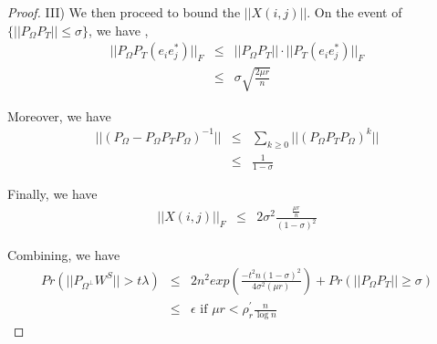 \begin{proof}
III) We then proceed to bound the $||X(i,j)||$. On the event of $\{||P_{\Omega}P_{T}||\le\sigma\}$,
we have , 
\begin{eqnarray*}
||P_{\Omega}P_{T}(e_{i}e_{j}^{*})||_{F} & \le & ||P_{\Omega}P_{T}||\cdot||P_{T}(e_{i}e_{j}^{*})||_{F}\\
 & \le & \sigma\sqrt{\frac{2\mu r}{n}}
\end{eqnarray*}


Moreover, we have 
\begin{eqnarray*}
||(P_{\Omega}-P_{\Omega}P_{T}P_{\Omega})^{-1}|| & \le & \sum_{k\ge0}||(P_{\Omega}P_{T}P_{\Omega})^{k}||\\
 & \le & \frac{1}{1-\sigma}
\end{eqnarray*}


Finally, we have 
\begin{eqnarray*}
||X(i,j)||_{F} & \le & 2\sigma^{2}\frac{\frac{\mu r}{n}}{(1-\sigma)^{2}}
\end{eqnarray*}


Combining, we have 
\begin{eqnarray*}
Pr(||P_{\Omega^{\bot}}W^{S}||>t\lambda) & \le & 2n^{2}exp(\frac{-t^{2}n(1-\sigma)^{2}}{4\sigma^{2}(\mu r)})+Pr(||P_{\Omega}P_{T}||\ge\sigma)\\
 & \le & \epsilon\text{ if }\mu r<\rho_{r}^{'}\frac{n}{\log n}
\end{eqnarray*}

\end{proof}

